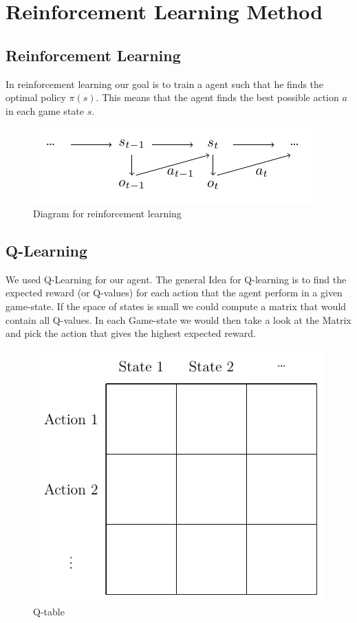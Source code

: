\chapter{Reinforcement Learning Method}

\section{Reinforcement Learning}

In reinforcement learning our goal is to train a agent such that he finds the optimal policy $\pi(s)$.
This means that the agent finds the best possible action $a$ in each game state $s$.


\begin{figure}[H]
	\centering
    \includegraphics[scale=1.5]{fig//rl_diagram.pdf}
	\caption{Diagram for reinforcement learning}
	\label{img:Q-table}
\end{figure}


\section{Q-Learning}

We used Q-Learning for our agent.
The general Idea for Q-learning is to find the expected reward (or Q-values) for each action that the agent perform in a given
game-state.
If the space of states is small we could compute a matrix that would contain all Q-values.
In each Game-state we would then take a look at the Matrix and pick the action that gives the highest expected reward.


\begin{figure}[H]
	\centering
    \includegraphics[scale=.8]{fig//q_table.pdf}
	\caption{Q-table}
	\label{img:Q-table}
\end{figure}

